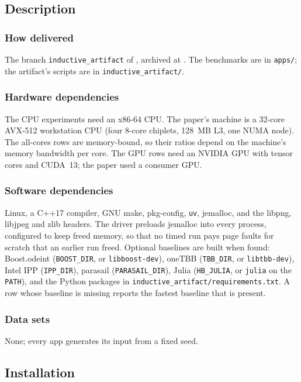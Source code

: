 \subsection{Description}

\subsubsection{How delivered}
The branch \texttt{inductive\_artifact} of \artifactrepo, archived at
\artifactdoi. The benchmarks are in \texttt{apps/}; the artifact's scripts are
in \texttt{inductive\_artifact/}.

\subsubsection{Hardware dependencies}
The CPU experiments need an x86-64 CPU. The paper's machine is a 32-core AVX-512
workstation CPU (four 8-core chiplets, 128~MB L3, one NUMA node). The
all-cores rows are memory-bound, so their ratios depend on the machine's memory
bandwidth per core. The GPU rows need an NVIDIA GPU with tensor cores and
CUDA~13; the paper used a consumer GPU.

\subsubsection{Software dependencies}
Linux, a C++17 compiler, GNU make, pkg-config, \texttt{uv}, jemalloc, and the
libpng, libjpeg and zlib headers. The driver
preloads jemalloc into every process, configured to keep freed memory, so that no
timed run pays page faults for scratch that an earlier run freed. Optional
baselines are built when found: Boost.odeint (\texttt{BOOST\_DIR}, or
\texttt{libboost-dev}), oneTBB (\texttt{TBB\_DIR}, or \texttt{libtbb-dev}), Intel
IPP (\texttt{IPP\_DIR}), parasail (\texttt{PARASAIL\_DIR}), Julia
(\texttt{HB\_JULIA}, or \texttt{julia} on the \texttt{PATH}), and the Python
packages in \texttt{inductive\_artifact/requirements.txt}. A row whose
baseline is missing reports the fastest baseline that is present.

\subsubsection{Data sets}
None; every app generates its input from a fixed seed.

\subsection{Installation}

